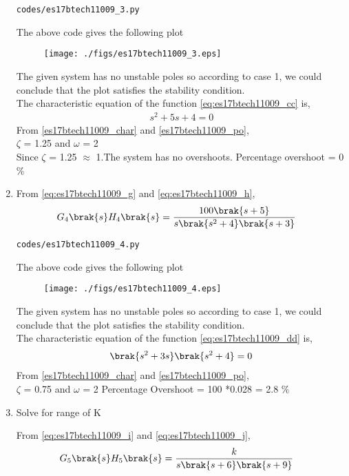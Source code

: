 \begin{enumerate}[label=\thesection.\arabic*.,ref=\thesection.\theenumi]
\begin{lstlisting}
codes/es17btech11009_3.py
\end{lstlisting}
The above code gives the following plot
\begin{figure}[!h]
\centering
\texttt{[image: ./figs/es17btech11009\_3.eps]}
\caption{}
\label{fig:es17btech11009_fig3}
\end{figure}
The given system has no unstable poles so according to case 1, we could conclude that the plot satisfies the stability condition.
\\
The characteristic equation of the  function \eqref{eq:es17btech11009_cc} is,
\begin{align}
 s^2+ 5s + 4 = 0
 \end{align}
From \eqref{es17btech11009_char} and \eqref{es17btech11009_po},
\\
  $\zeta$ = 1.25 and $\omega$ = 2
  \\
  Since  $\zeta$ = 1.25 $\approx$ 1.The system has no overshoots.
  Percentage overshoot = 0 \%
\item
From \eqref{eq:es17btech11009_g} and \eqref{eq:es17btech11009_h},
\begin{align}
G_4\brak{s}H_4\brak{s}&= \frac{100\brak{s+5}}{s\brak{s^2+4}\brak{s+3}}
\label{eq:es17btech11009_dd}
\end{align}
\begin{lstlisting}
codes/es17btech11009_4.py
\end{lstlisting}
The above code gives the following plot
\begin{figure}[!h]
\centering
\texttt{[image: ./figs/es17btech11009\_4.eps]}
\caption{}
\label{fig:es17btech11009_fig4}
\end{figure}
The given system has no unstable poles so according to case 1, we could conclude that the plot satisfies the stability condition.
\\
The characteristic equation of the function \eqref{eq:es17btech11009_dd} is,
\begin{align}
\brak{s^2+3s}\brak{s^2 + 4} = 0
\end{align}
From \eqref{es17btech11009_char} and \eqref{es17btech11009_po},
\\
$\zeta$ = 0.75 and $\omega$ = 2
Percentage Overshoot = 100 *0.028 = 2.8 \%

\item Solve for range of K

\solution
From \eqref{eq:es17btech11009_i} and \eqref{eq:es17btech11009_j},
\begin{align}
G_5\brak{s}H_5\brak{s}&= \frac{k}{s\brak{s+6}\brak{s+9}}
\label{eq:es17btech11009_ee}
\end{align}


\end{enumerate}
